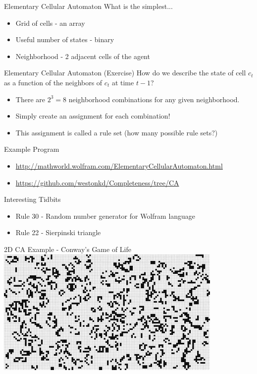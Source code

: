 \documentclass[bigger]{beamer}
\begin{document}
\begin{frame}[label=sec-10]{Elementary Cellular Automaton}
What is the simplest...
\begin{itemize}
\item<1->Grid of cells - an array
\item<1->Useful number of states - binary
\item<1->Neighborhood - 2 adjacent cells of the agent
\end{itemize}
\end{frame}

\begin{frame}[label=sec-11]{Elementary Cellular Automaton (Exercise)}
How do we describe the state of cell \(c_t\) as a function of the neighbors of \(c_t\) at time \(t-1\)?
\begin{itemize}
\item<2->There are \(2^3 = 8\) neighborhood combinations for any given neighborhood.
\item<3->Simply create an assignment for each combination!
\item<4->This assignment is called a rule set (how many possible rule sets?)
\end{itemize}
\end{frame}
\begin{frame}[label=sec-12]{Example Program}
\begin{itemize}
\item \url{http://mathworld.wolfram.com/ElementaryCellularAutomaton.html}
\item \url{https://github.com/westonkd/Completeness/tree/CA}
\end{itemize}
\end{frame}

\begin{frame}[label=sec-13]{Interesting Tidbits}
\begin{itemize}
\item<1->Rule 30 - Random number generator for Wolfram language
\item<2->Rule 22 - Sierpinski triangle
\end{itemize}
\end{frame}
\begin{frame}[label=sec-14]{2D CA Example - Conway's Game of Life}
\includegraphics[width=11cm]{images/gol1.jpg}
\end{frame}
\end{document}
